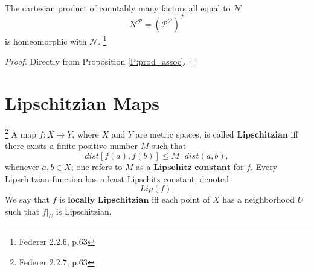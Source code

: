 \begin{lemma} \label{L:prod_baire}
The cartesian product of countably many factors all equal to $\mathcal{N}$ 
\[
  \mathcal{N}^{\mathcal{P}} = (\mathcal{P}^{\mathcal{P}})^{\mathcal{P}}
\]
is homeomorphic with $\mathcal{N}$.
\footnote{Federer 2.2.6, p.63}
\end{lemma}
\begin{proof}
Directly from Proposition \ref{P:prod_assoc}.
% 
% 
% 
% 

\end{proof}











\section{Lipschitzian Maps}

\begin{definition} \label{D:lipschitz}
\footnote{Federer 2.2.7, p.63}
A map $f:X\to Y$, where $X$ and $Y$ are metric spaces, is called
$\textbf{Lipschitzian}$ 
iff there exists a finite positive number $M$ such that
\[
  dist[f(a),f(b)] \leq M \cdot dist(a,b),
\]
whenever $a,b\in X$; one refers to $M$ as a $\textbf{Lipschitz constant}$ for
$f$. Every Lipschitzian function has a least Lipschitz constant, denoted
\[
  Lip(f).
\]
We say that $f$ is $\textbf{locally Lipschitzian}$
iff each point of $X$ has a
neighborhood $U$ such that $f|_U$ is Lipschitzian.
\end{definition}

